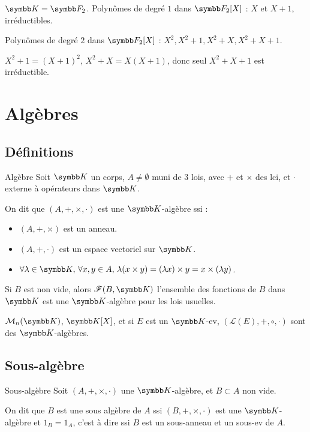\begin{exemple}
    $\K = \symbb F_2$. Polynômes de degré $1$ dans $\symbb F_2[X]$ : $X$ et $X + 1$, irréductibles.

    Polynômes de degré $2$ dans $\symbb F_2[X]$ : $X^2, X^2 + 1, X^2 + X, X^2 + X + 1$.

    $X^2 + 1 = (X + 1)^2$, $X^2 + X = X(X + 1)$, donc seul $X^2 + X + 1$ est irréductible.
\end{exemple}

\section{Algèbres} 
\subsection{Définitions}

\begin{definition}{Algèbre}{}
    Soit $\K$ un corps, $A \neq \emptyset$ muni de 3 lois, avec $+$ et $\times$ des lci, 
    et $\cdot$ externe à opérateurs dans $\K$.

    On dit que $(A, +, \times, \cdot)$ est une $\K$-algèbre ssi :
    \begin{itemize}
        \item $(A, +, \times)$ est un anneau.
        \item $(A, +, \cdot)$ est un espace vectoriel sur $\K$.
        \item $\forall \lambda \in \K, \, \forall x, y \in A, \, \lambda (x \times y) = (\lambda x) \times y = x \times (\lambda y)$.
    \end{itemize}

\end{definition}

\begin{exemple}
    Si $B$ est non vide, alors $\mathscr F(B, \K)$ l'ensemble des fonctions de $B$ dans $\K$ est une $\K$-algèbre
    pour les lois usuelles.

    $\mathcal M_n(\K)$, $\K[X]$, et si $E$ est un $\K$-ev, $(\mathcal L(E), +, \circ, \cdot)$ sont des $\K$-algèbres.
\end{exemple}

\subsection{Sous-algèbre}

\begin{definition}{Sous-algèbre}{}
    Soit $(A, +, \times, \cdot)$ une $\K$-algèbre, et $B \subset A$ non vide. 

    On dit que $B$ est une sous algèbre de $A$ ssi $(B, +, \times, \cdot)$ est une $\K$-algèbre 
    et $1_B = 1_A$, c'est à dire ssi $B$ est un sous-anneau et un sous-ev de $A$.
\end{definition}

